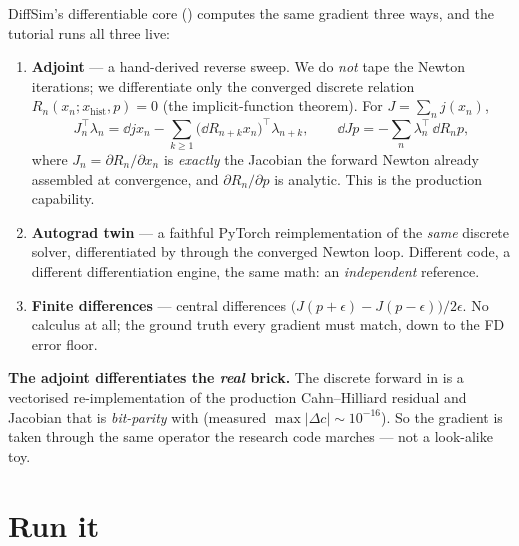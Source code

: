 DiffSim's differentiable core () computes the
same gradient three ways, and the tutorial runs all three live:

\begin{enumerate}[nosep]
  \item \textbf{Adjoint} --- a hand-derived reverse sweep. We do
        \emph{not} tape the Newton iterations; we differentiate only the
        converged discrete relation $R_n(x_n; x_{\text{hist}}, p)=0$ (the
        implicit-function theorem). For $J=\sum_n j(x_n)$,
        \begin{equation}
          J_n^{\!\top}\lambda_n = \dd{j}{x_n}
            - \!\sum_{k\ge1}\Big(\dd{R_{n+k}}{x_n}\Big)^{\!\top}\!\lambda_{n+k},
          \qquad
          \dd{J}{p} = -\sum_n \lambda_n^{\!\top}\,\dd{R_n}{p},
          \label{eq:d1adj}
        \end{equation}
        where $J_n=\partial R_n/\partial x_n$ is \emph{exactly} the
        Jacobian the forward Newton already assembled at convergence, and
        $\partial R_n/\partial p$ is analytic. This is the production
        capability.
  \item \textbf{Autograd twin} --- a faithful PyTorch reimplementation of
        the \emph{same} discrete solver, differentiated by
         through the converged Newton loop. Different
        code, a different differentiation engine, the same math: an
        \emph{independent} reference.
  \item \textbf{Finite differences} --- central differences
        $\big(J(p+\epsilon)-J(p-\epsilon)\big)/2\epsilon$. No calculus at
        all; the ground truth every gradient must match, down to the FD
        error floor.
\end{enumerate}

\begin{keybox}
\textbf{The adjoint differentiates the \emph{real} brick.} The discrete
forward in  is a vectorised re-implementation
of the production Cahn--Hilliard residual and Jacobian that is
\emph{bit-parity} with  (measured
$\max|\Delta c|\sim10^{-16}$). So the gradient is taken through the same
operator the research code marches --- not a look-alike toy.
\end{keybox}

\section{Run it}

